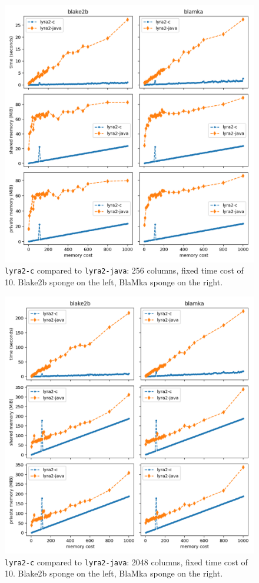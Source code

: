 \begin{figure}[H]
    \centering
    \includegraphics[width=\linewidth,keepaspectratio]{figures/mcost_256}
    \caption{\texttt{lyra2-c} compared to \texttt{lyra2-java}: 256 columns, fixed time cost of 10. Blake2b sponge on the left, BlaMka sponge on the right.}
    \label{figure:mcost_256}
\end{figure}

\begin{figure}[H]
    \centering
    \includegraphics[width=\linewidth,keepaspectratio]{figures/mcost_2048}
    \caption{\texttt{lyra2-c} compared to \texttt{lyra2-java}: 2048 columns, fixed time cost of 10. Blake2b sponge on the left, BlaMka sponge on the right.}
    \label{figure:mcost_2048}
\end{figure}

